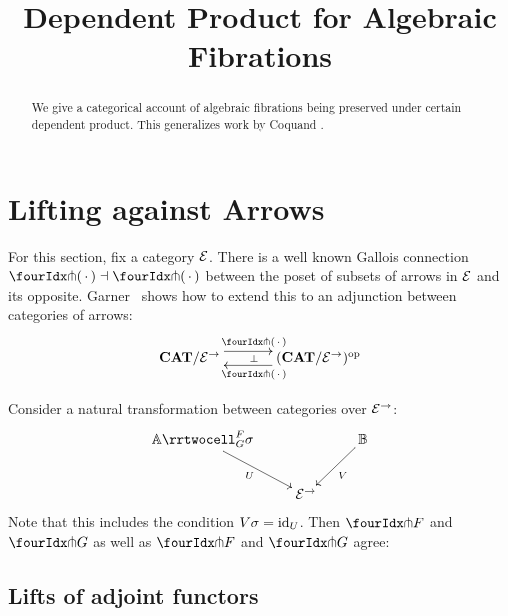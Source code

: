 \documentclass[reqno,10pt,a4paper,oneside]{amsart}
\title{Dependent Product for Algebraic Fibrations}
\begin{document}
\begin{abstract}
We give a categorical account of algebraic fibrations being preserved under certain dependent product.
This generalizes work by Coquand \etal.
\end{abstract}

\maketitle

\tableofcontents

\section{Lifting against Arrows}

For this section, fix a category $\mathcal{E}$.
There is a well known Gallois connection $\liftr{\brarghole} \dashv \liftl{\brarghole}$ between the poset of subsets of arrows in $\mathcal{E}$ and its opposite.
Garner~\cite{garner:small-object-argument} shows how to extend this to an adjunction between categories of arrows:
\begin{equation}
\label{garner-adjunction}
\begin{gathered}
\xymatrix@C+1em{
  \CAT/\catE^{\to}
  \ar@<5pt>[r]^{\liftl{\brarghole}}
  \ar@{}[r]|{\bot}
&
  (\CAT/\catE^{\to})^{\op}
  \ar@<5pt>[l]^{\liftr{\brarghole}}
}
\end{gathered}
\end{equation}

\begin{lemma}
Consider a natural transformation between categories over $\mathcal{E}^{\to}$:
\[
\xymatrix{
  \cat{A}
  \rrtwocell_G^F{\sigma}
 \ar[dr]_{U}
&&
  \cat{B}
  \ar[dl]^{V}
\\&
  \catE^{\to}
}
\]
Note that this includes the condition $V \sigma = \operatorname{id}_U$.
Then $\liftr{F}$ and $\liftr{G}$ as well as $\liftl{F}$ and $\liftl{G}$ agree:
\end{lemma}

\subsection{Lifts of adjoint functors}
\end{document}
